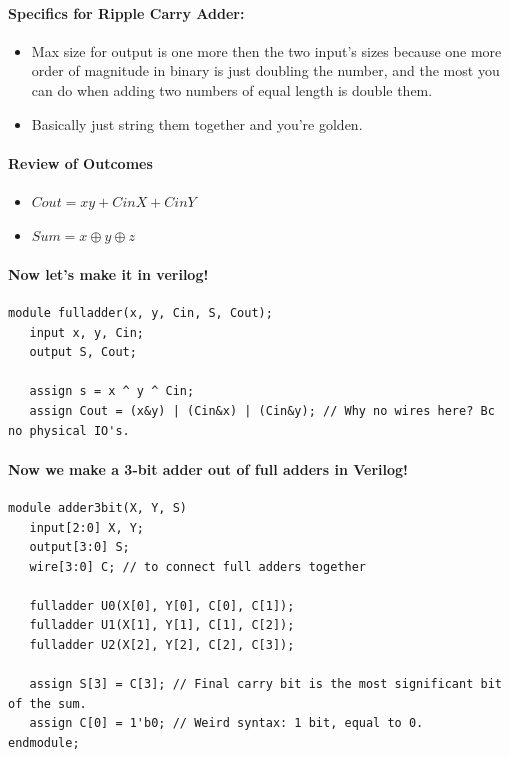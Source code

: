 \documentclass[a4paper,12pt]{report}
\begin{document}
\paragraph{Specifics for Ripple Carry Adder: }
\begin{itemize}
\item Max size for output is one more then the two input's sizes because one more order of 
magnitude in binary is just doubling the number, and the most you can do when adding two 
numbers of equal length is double them.
\item Basically just string them together and you're golden.
\end{itemize}

\paragraph{Review of Outcomes}
\begin{itemize}
\item $Cout = xy + CinX + CinY$
\item $Sum = x \oplus y \oplus z$
\end{itemize}

\paragraph{Now let's make it in verilog!}
\begin{lstlisting}
module fulladder(x, y, Cin, S, Cout);
   input x, y, Cin;
   output S, Cout;

   assign s = x ^ y ^ Cin;
   assign Cout = (x&y) | (Cin&x) | (Cin&y); // Why no wires here? Bc no physical IO's.
\end{lstlisting}

\paragraph{Now we make a 3-bit adder out of full adders in Verilog!}
\begin{lstlisting}
module adder3bit(X, Y, S)
   input[2:0] X, Y;
   output[3:0] S;
   wire[3:0] C; // to connect full adders together

   fulladder U0(X[0], Y[0], C[0], C[1]);
   fulladder U1(X[1], Y[1], C[1], C[2]);
   fulladder U2(X[2], Y[2], C[2], C[3]);

   assign S[3] = C[3]; // Final carry bit is the most significant bit of the sum.
   assign C[0] = 1'b0; // Weird syntax: 1 bit, equal to 0.
endmodule;
\end{lstlisting}
\end{document}
